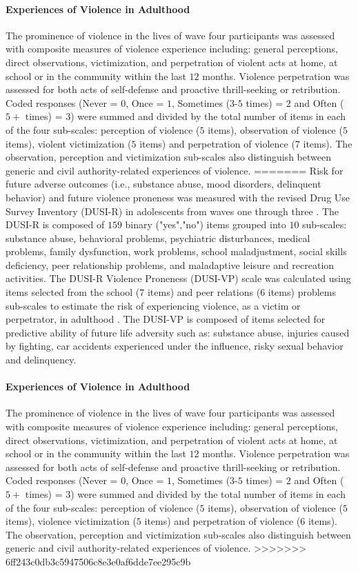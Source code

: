 \documentclass[utf8]{article}
\begin{document}
\paragraph{Experiences of Violence in Adulthood} The prominence of violence in the lives of wave four participants was assessed with composite measures of violence experience including: general perceptions, direct observations, victimization, and perpetration of violent acts at home, at school or in the community within the last $12$ months. Violence perpetration was assessed for both acts of self-defense and proactive thrill-seeking or retribution. Coded responses (Never = $0$, Once = $1$, Sometimes ($3$-$5$ times) = $2$ and Often ($5+$ times) = $3$) were summed and divided by the total number of items in each of the four sub-scales: perception of violence ($5$ items), observation of violence ($5$ items), violent victimization ($5$ items) and perpetration of violence ($7$ items). The observation, perception and victimization sub-scales also distinguish between generic and civil authority-related experiences of violence. 
=======
Risk for future adverse outcomes (i.e., substance abuse, mood disorders, delinquent behavior) and future violence proneness was measured with the revised Drug Use Survey Inventory (DUSI-R) in adolescents from waves one through three  \citep*{tarter1994reliability}. The DUSI-R is composed of $159$ binary ("yes","no") items grouped into $10$ sub-scales: substance abuse, behavioral problems, psychiatric disturbances, medical problems, family dysfunction, work problems, school maladjustment, social skills deficiency, peer relationship problems, and maladaptive leisure and recreation activities. The DUSI-R Violence Proneness (DUSI-VP) scale was calculated using items selected from the school ($7$ items) and peer relations ($6$ items) problems sub-scales to estimate the risk of experiencing violence, as a victim or perpetrator, in adulthood \citep*{kirisci2009violence}. The DUSI-VP is composed of items selected for predictive ability of future life adversity such as: substance abuse, injuries caused by fighting, car accidents experienced under the influence, risky sexual behavior and delinquency.
\paragraph{Experiences of Violence in Adulthood} The prominence of violence in the lives of wave four participants was assessed with composite measures of violence experience including: general perceptions, direct observations, victimization, and perpetration of violent acts at home, at school or in the community within the last $12$ months. Violence perpetration was assessed for both acts of self-defense and proactive thrill-seeking or retribution. Coded responses (Never = $0$, Once = $1$, Sometimes ($3$-$5$ times) = $2$ and Often ($5+$ times) = $3$) were summed and divided by the total number of items in each of the four sub-scales: perception of violence ($5$ items), observation of violence ($5$ items), violence victimization ($5$ items) and perpetration of violence ($6$ items). The observation, perception and victimization sub-scales also distinguish between generic and civil authority-related experiences of violence. 
>>>>>>> 6ff243c0db3c5947506c8e3e0af6dde7ee295c9b
\end{document}

